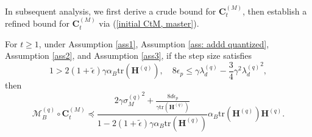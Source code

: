 \documentclass[11pt, letterpaper]{article}
\begin{document}
In subsequent analysis, we first derive a crude bound for $\mathbf{C}_t^{(M)}$, then establish a refined bound for $\mathbf{C}_t^{(M)}$ via (\ref{initial CtM, master}).
\begin{lemma}
    \label{A bound for M_B^{(q)} C_t^{(M)}, master}
    For $t \geq 1$, under Assumption \ref{ass1}, Assumption \ref{ass: addd quantized}, Assumption \ref{ass2}, and Assumption \ref{ass3}, if the step size satisfies
    \begin{equation*}
        1>2(1+\tilde{\epsilon})\gamma\alpha_B\mathrm{tr}(\mathbf{H}^{(q)}),\quad 8\epsilon_p\leq \gamma \lambda_d^{(q)}-\frac{3}{4}\gamma^2{\lambda_d^{(q)}}^2,
    \end{equation*}
    then
    \begin{equation*}
        \mathcal{M}_B^{(q)} \circ \mathbf{C}_t^{(M)} \preceq\frac{2\gamma{\sigma_M^{(q)}}^2+\frac{8d\epsilon_p}{\gamma\mathrm{tr}(\mathbf{H}^{(q)})}}{1-2(1+\tilde{\epsilon})\gamma\alpha_B\mathrm{tr}(\mathbf{H}^{(q)})}\alpha_B\mathrm{tr}(\mathbf{H}^{(q)})\mathbf{H}^{(q)}.
    \end{equation*}
\end{lemma}
\end{document}
